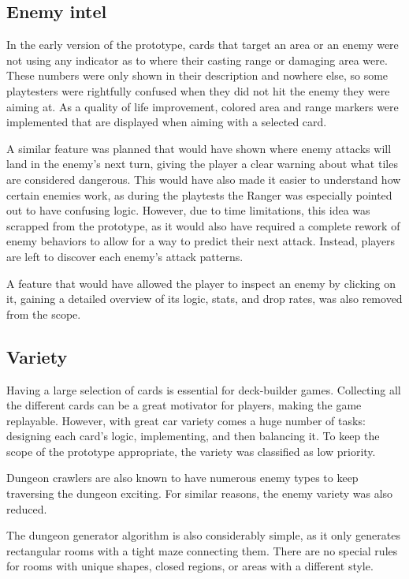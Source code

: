 \subsection{Enemy intel}

In the early version of the prototype, cards that target an area or an enemy were not using any indicator as to where their casting range or damaging area were. These numbers were only shown in their description and nowhere else, so some playtesters were rightfully confused when they did not hit the enemy they were aiming at. As a quality of life improvement, colored area and range markers were implemented that are displayed when aiming with a selected card.

A similar feature was planned that would have shown where enemy attacks will land in the enemy's next turn, giving the player a clear warning about what tiles are considered dangerous. This would have also made it easier to understand how certain enemies work, as during the playtests the Ranger was especially pointed out to have confusing logic. However, due to time limitations, this idea was scrapped from the prototype, as it would also have required a complete rework of enemy behaviors to allow for a way to predict their next attack. Instead, players are left to discover each enemy's attack patterns.

A feature that would have allowed the player to inspect an enemy by clicking on it, gaining a detailed overview of its logic, stats, and drop rates, was also removed from the scope.



\subsection{Variety}

Having a large selection of cards is essential for deck-builder games. Collecting all the different cards can be a great motivator for players, making the game replayable. However, with great car variety comes a huge number of tasks: designing each card's logic, implementing, and then balancing it. To keep the scope of the prototype appropriate, the variety was classified as low priority.

Dungeon crawlers are also known to have numerous enemy types to keep traversing the dungeon exciting. For similar reasons, the enemy variety was also reduced.

The dungeon generator algorithm is also considerably simple, as it only generates rectangular rooms with a tight maze connecting them. There are no special rules for rooms with unique shapes, closed regions, or areas with a different style.

